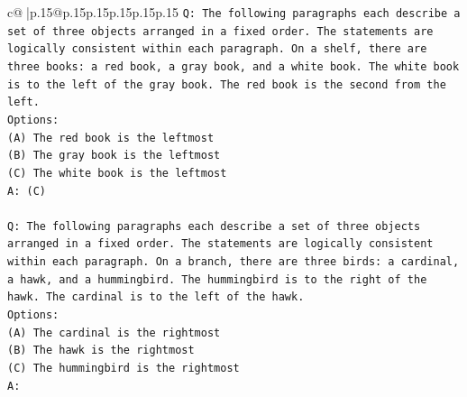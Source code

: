 \documentclass{article}
\begin{document}
{\begin{supertabular}{c@{$\;$}|p{.15\linewidth}@{}p{.15\linewidth}p{.15\linewidth}p{.15\linewidth}p{.15\linewidth}p{.15\linewidth}}
{{{\texttt{Q: The following paragraphs each describe a set of three objects arranged in a fixed order. The statements are logically consistent within each paragraph. On a shelf, there are three books: a red book, a gray book, and a white book. The white book is to the left of the gray book. The red book is the second from the left.} \\
\texttt{Options:} \\
\texttt{(A) The red book is the leftmost} \\
\texttt{(B) The gray book is the leftmost} \\
\texttt{(C) The white book is the leftmost} \\
\texttt{A: (C)} \\
\\ 
\texttt{Q: The following paragraphs each describe a set of three objects arranged in a fixed order. The statements are logically consistent within each paragraph. On a branch, there are three birds: a cardinal, a hawk, and a hummingbird. The hummingbird is to the right of the hawk. The cardinal is to the left of the hawk.} \\
\texttt{Options:} \\
\texttt{(A) The cardinal is the rightmost} \\
\texttt{(B) The hawk is the rightmost} \\
\texttt{(C) The hummingbird is the rightmost} \\
\texttt{A:} \\
            }
        }
    }
     \\ \\


\end{supertabular}}
\end{document}
